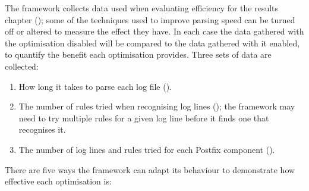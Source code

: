 The framework collects data used when evaluating \parsernames{} efficiency
for the results chapter (); some of the techniques used
to improve parsing speed can be turned off or altered to measure the effect
they have.  In each case the data gathered with the optimisation disabled
will be compared to the data gathered with it enabled, to quantify the
benefit each optimisation provides.  Three sets of data are collected:

\begin{enumerate}

    \item How long it takes to parse each log file ().

    \item The number of rules tried when recognising log lines
        (); the framework
        may need to try multiple rules for a given log line before it finds
        one that recognises it.

    \item The number of log lines and rules tried for each Postfix
        component ().

\end{enumerate}

There are five ways the framework can adapt its behaviour to demonstrate
how effective each optimisation is:

